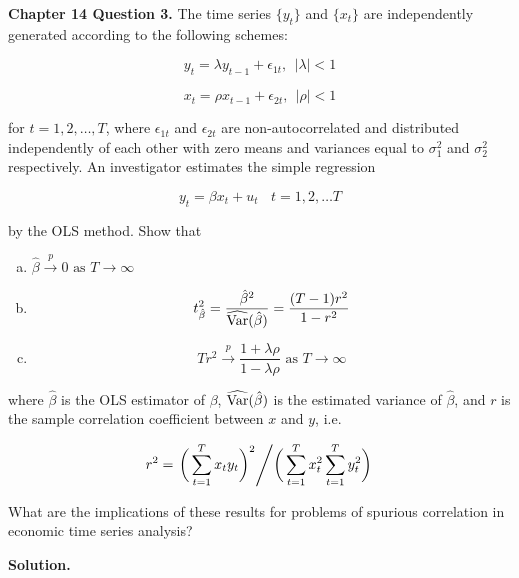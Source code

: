 
\textbf{Chapter 14 Question 3.} The time series \(\{y_t\}\) and \(\{x_t\}\) are independently generated according to the following schemes:

\[
y_t = \lambda y_{t-1} + \epsilon_{1t}, \ \ |\lambda| < 1
\]

\[
x_t = \rho x_{t-1} + \epsilon_{2t}, \ \ |\rho| < 1
\]

for \(t= 1, 2,\ldots, T\), where \(\epsilon_{1t}\) and \(\epsilon_{2t}\) are non-autocorrelated and distributed independently of each other with zero means and variances equal to \(\sigma_1^2\) and \(\sigma_2^2\) respectively. An investigator estimates the simple regression

\[
y_t = \beta x_t + u_t \ \ \ \ t = 1, 2, \ldots T
\]

by the OLS method. Show that

\begin{enumerate}[(a)]

\item \(\hat{\beta} \xrightarrow{p} 0 \text{ as } T \to \infty\)

\item 

\[
t_{\hat{\beta}}^2 = \frac{\hat{\beta}^2}{\widehat{\mathrm{Var}}(\hat{\beta})} = \frac{(T - 1)r^2}{1-r^2}
\]

\item 

\[
Tr^2 \xrightarrow{p} \frac{1 + \lambda \rho}{1 - \lambda \rho} \text{ as } T \to \infty
\]

\end{enumerate}

where \(\hat{\beta}\) is the OLS estimator of \(\beta\), \(\widehat{\mathrm{Var}}(\hat{\beta})\) is the estimated variance of \(\hat{\beta}\), and \(r\) is the sample correlation coefficient between \(x\) and \(y\), i.e.

\[
r^2 = \left.  \bigg(\sum_{t=1}^T x_t y_t \bigg)^2 \middle/ \bigg( \sum_{t=1}^T x_t^2 \sum_{t=1}^T y_t^2 \bigg)  \right.
\]

What are the implications of these results for problems of spurious correlation in economic time series analysis?


\textbf{Solution.} 


